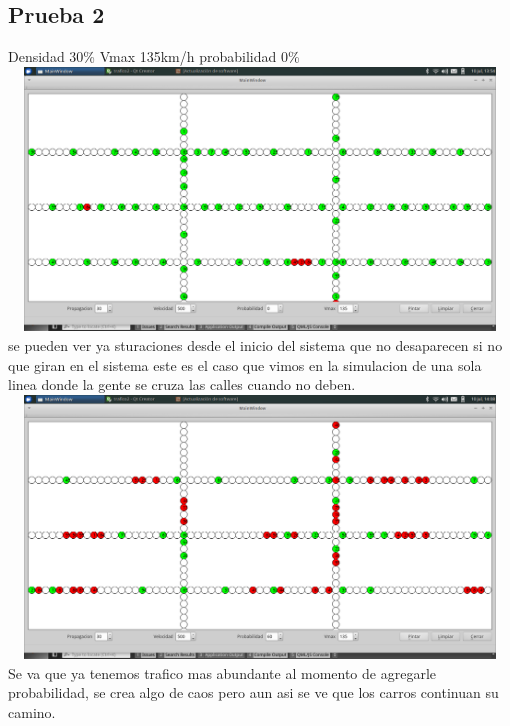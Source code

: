 \documentclass[a4paper,10pt]{article}
\begin{document}
\subsection{Prueba 2}
Densidad 30\% Vmax 135km/h probabilidad 0\%
\\
\includegraphics[width=15cm, height=7cm]{34}
\\
se pueden ver ya sturaciones desde el inicio del sistema que no desaparecen si no que giran en el sistema este es el caso que vimos en la simulacion de una sola linea donde la gente se cruza las calles cuando no deben.
\\
\includegraphics[width=15cm, height=7cm]{35}
\\
Se va que ya tenemos trafico mas abundante al momento de agregarle probabilidad, se crea algo de caos pero aun asi se ve que los carros continuan su camino.
\end{document}
